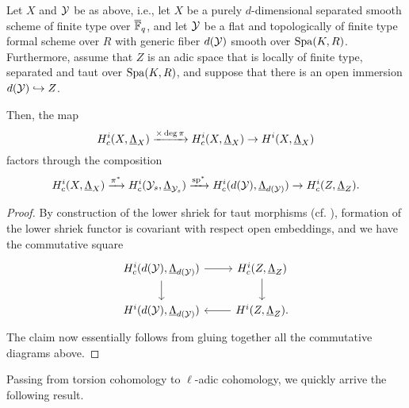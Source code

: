 \documentclass[../main.tex]{subfiles}
\begin{document}
\begin{prop}\label{thm:SubspaceInjectionFiniteLevel}
  Let $X$ and $\mathcal{Y}$ be as above, i.e., let $X$ be a purely $d$-dimensional
  separated smooth scheme of finite type over ${\overline {\mathbb{F}}_q}$, and let 
  $\mathcal{Y}$ be a flat and topologically of finite type formal scheme over $R$ with 
  generic fiber $d(\mathcal{Y})$ smooth over $\operatorname{Spa}(K,R)$. Furthermore, assume that 
  $Z$ is an adic space that is locally of finite type, separated and taut
  over $\operatorname{Spa}(K,R)$, and suppose that there is an open immersion
  $d(\mathcal{Y}) \hookrightarrow Z$.

  Then, the map 
  \begin{equation*}
    H_c^i(X, \underline \Lambda_X) \xrightarrow{\times \deg \pi} 
    H_c^i(X, \underline \Lambda_X) \to 
    H^i(X,   \underline \Lambda_X)
  \end{equation*}
  factors through the composition
  \begin{equation*}
    H_c^i(X,      \underline \Lambda_X) \xrightarrow{\pi^*}
    H_c^i(\mathcal{Y}_s,  \underline \Lambda_{\mathcal{Y}_s}) \xrightarrow{\mathrm{sp}^*}
    H_c^i(d(\mathcal{Y}), \underline \Lambda_{d(\mathcal{Y})}) \to 
    H_c^i(Z,      \underline \Lambda_Z).
  \end{equation*}
\begin{proof}
  By construction of the lower shriek for taut morphisms (cf. \cite[Section 0.4
  D)]{huber2013etale}), formation of the lower shriek functor is covariant with
  respect open embeddings, and we have the commutative square
  \begin{equation*}
    \begin{tikzcd}[ampersand replacement=\&]
      {\hH^i_c(d(\cY), \underline \Lambda_{d(\cY)})} \& 
      {\hH^i_c(Z, \underline \Lambda_{Z})} \\
    	{\hH^i(d(\cY), \underline \Lambda_{d(\cY)})} \& 
      {\hH^i(Z, \underline \Lambda_{Z})}.
    	\arrow[from=1-1, to=1-2]
    	\arrow[from=1-1, to=2-1]
    	\arrow[from=1-2, to=2-2]
    	\arrow[from=2-2, to=2-1]
    \end{tikzcd}
  \end{equation*}
  The claim now essentially follows from gluing together all the commutative
  diagrams above. 
\end{proof}
\end{prop}

Passing from torsion cohomology to $\ell$-adic cohomology, we quickly arrive
the following result.
\end{document}
